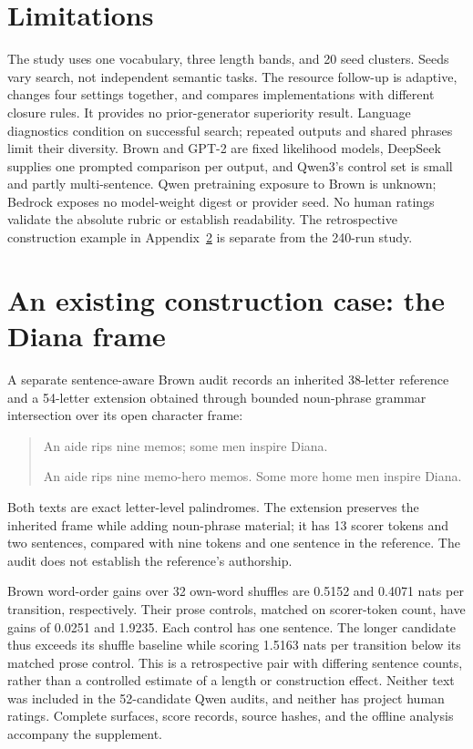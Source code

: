 \documentclass[11pt]{article}
\begin{document}
\section{Limitations}

The study uses one vocabulary, three length bands, and 20 seed clusters. Seeds vary search, not independent semantic tasks. The resource follow-up is adaptive, changes four settings together, and compares implementations with different closure rules. It provides no prior-generator superiority result. Language diagnostics condition on successful search; repeated outputs and shared phrases limit their diversity. Brown and GPT-2 are fixed likelihood models, DeepSeek supplies one prompted comparison per output, and Qwen3's control set is small and partly multi-sentence. Qwen pretraining exposure to Brown is unknown; Bedrock exposes no model-weight digest or provider seed. No human ratings validate the absolute rubric or establish readability. The retrospective construction example in Appendix~\ref{sec:diana} is separate from the 240-run study.



\appendix
\section{An existing construction case: the Diana frame}
\label{sec:diana}

A separate sentence-aware Brown audit records an inherited 38-letter reference and a 54-letter extension obtained through bounded noun-phrase grammar intersection over its open character frame:
\begin{quote}\small
An aide rips nine memos; some men inspire Diana.

An aide rips nine memo-hero memos. Some more home men inspire Diana.
\end{quote}
Both texts are exact letter-level palindromes. The extension preserves the inherited frame while adding noun-phrase material; it has 13 scorer tokens and two sentences, compared with nine tokens and one sentence in the reference. The audit does not establish the reference's authorship.

Brown word-order gains over 32 own-word shuffles are 0.5152 and 0.4071 nats per transition, respectively. Their prose controls, matched on scorer-token count, have gains of 0.0251 and 1.9235. Each control has one sentence. The longer candidate thus exceeds its shuffle baseline while scoring 1.5163 nats per transition below its matched prose control. This is a retrospective pair with differing sentence counts, rather than a controlled estimate of a length or construction effect. Neither text was included in the 52-candidate Qwen audits, and neither has project human ratings. Complete surfaces, score records, source hashes, and the offline analysis accompany the supplement.
\end{document}
